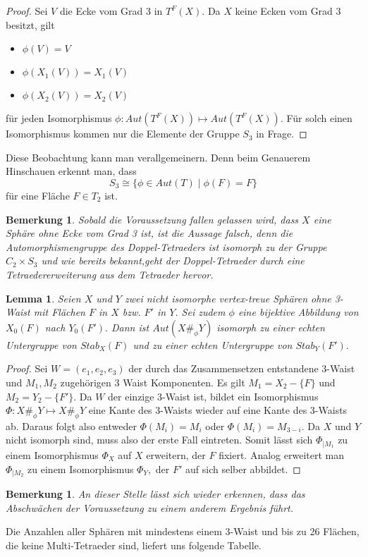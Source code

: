 \documentclass[12pt,titlepage,twoside,cleardoublepage]{article}
\theoremstyle{nummermitklammern}
\newtheorem{lemma}[temp]{Lemma}
\newtheorem{bemerkung}[temp]{Bemerkung}
\newtheorem{lemma}[zahl]{Lemma}
\newtheorem{bemerkung}[zahl]{Bemerkung}
\numberwithin{equation}{section}
\begin{document}
\begin{proof}
Sei $V$ die Ecke vom Grad 3 in $T^F(X).$
Da $X$ keine Ecken vom Grad 3 besitzt, gilt
\begin{itemize}
\item $\phi(V)=V$
\item $\phi (X_1(V))=X_1(V)$
\item $\phi (X_2(V))=X_2(V)$
\end{itemize}
für jeden Isomorphismus $\phi:Aut({T}^F(X))\mapsto Aut({T}^F(X)).$ Für solch einen Isomorphismus kommen nur die Elemente der Gruppe $S_3$ in Frage. 
\end{proof}
Diese Beobachtung kann man verallgemeinern. Denn beim Genauerem Hinschauen erkennt man, dass 
\[
S_3\cong\{\phi\in Aut(T)\mid \phi(F)=F\}
\] für eine Fläche $F\in T_2$ ist.
\begin{bemerkung}
Sobald die Voraussetzung fallen gelassen wird, dass $X$ eine Sphäre ohne Ecke vom Grad 3 ist, ist die Aussage falsch, denn die Automorphismengruppe des Doppel-Tetraeders ist isomorph zu der Gruppe $C_2\times S_3$ und wie bereits bekannt,geht der Doppel-Tetraeder durch eine Tetraedererweiterung aus dem  Tetraeder hervor.
\end{bemerkung}
\begin{lemma}
Seien $X$ und $Y$ zwei nicht isomorphe vertex-treue Sphären ohne 3-Waist mit Flächen $F$ in $X$ bzw. $F'$ in $Y$. Sei zudem $\phi$ eine bijektive Abbildung von $X_0(F)$ nach $Y_0(F').$ Dann ist $Aut(X\#_\phi Y)$ isomorph zu einer echten Untergruppe von $Stab_X(F)$ und zu einer echten Untergruppe von $Stab_Y(F').$
\end{lemma}
\begin{proof}
Sei $W=(e_1,e_2,e_3)$ der durch das Zusammensetzen entstandene 3-Waist und $M_1,M_2$ zugehörigen 3 Waist Komponenten. Es gilt $M_1=X_2-\{F\}$ und $M_2=Y_2-\{F'\}.$ Da $W$ der einzige 3-Waist ist, bildet ein Isomorphismus $\Phi:X\#_{\phi}Y \mapsto X\#_{\phi}Y$  eine Kante des 3-Waists wieder auf eine Kante des 3-Waists ab. Daraus folgt also entweder $\Phi(M_i)=M_i$ oder $\Phi(M_i)=M_{3-i}.$ Da $X$ und $Y$ nicht isomorph sind, muss also der erste Fall eintreten. Somit lässt sich \textsc{$\Phi_{\mid M_1}$} zu einem Isomorphismus $\Phi_X$ auf $X$ erweitern, der $F$ fixiert. Analog erweitert man $\Phi_{\mid M_2}$ zu einem Isomorphismus $\Phi_Y,$ der $F'$ auf sich selber abbildet.
\end{proof}
\begin{bemerkung}
An dieser Stelle lässt sich wieder erkennen, dass das Abschwächen
der Voraussetzung zu einem anderem Ergebnis führt.
\end{bemerkung}
Die Anzahlen aller Sphären mit mindestens einem 3-Waist und bis zu 26 Flächen,
die keine Multi-Tetraeder sind, liefert uns folgende Tabelle.
\end{document}
